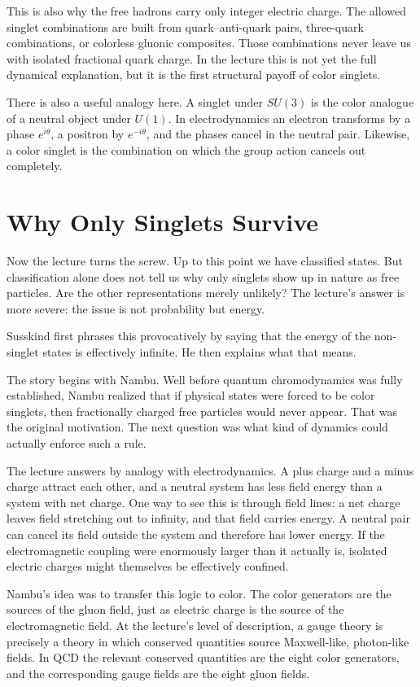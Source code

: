 This is also why the free hadrons carry only integer electric charge. The allowed singlet combinations are built from quark--anti-quark pairs, three-quark combinations, or colorless gluonic composites. Those combinations never leave us with isolated fractional quark charge. In the lecture this is not yet the full dynamical explanation, but it is the first structural payoff of color singlets.

There is also a useful analogy here. A singlet under \(SU(3)\) is the color analogue of a neutral object under \(U(1)\). In electrodynamics an electron transforms by a phase \(e^{i\theta}\), a positron by \(e^{-i\theta}\), and the phases cancel in the neutral pair. Likewise, a color singlet is the combination on which the group action cancels out completely.

\section{Why Only Singlets Survive}

Now the lecture turns the screw. Up to this point we have classified states. But classification alone does not tell us why only singlets show up in nature as free particles. Are the other representations merely unlikely? The lecture's answer is more severe: the issue is not probability but energy.

Susskind first phrases this provocatively by saying that the energy of the non-singlet states is effectively infinite. He then explains what that means.

The story begins with Nambu. Well before quantum chromodynamics was fully established, Nambu realized that if physical states were forced to be color singlets, then fractionally charged free particles would never appear. That was the original motivation. The next question was what kind of dynamics could actually enforce such a rule.

The lecture answers by analogy with electrodynamics. A plus charge and a minus charge attract each other, and a neutral system has less field energy than a system with net charge. One way to see this is through field lines: a net charge leaves field stretching out to infinity, and that field carries energy. A neutral pair can cancel its field outside the system and therefore has lower energy. If the electromagnetic coupling were enormously larger than it actually is, isolated electric charges might themselves be effectively confined.

Nambu's idea was to transfer this logic to color. The color generators are the sources of the gluon field, just as electric charge is the source of the electromagnetic field. At the lecture's level of description, a gauge theory is precisely a theory in which conserved quantities source Maxwell-like, photon-like fields. In QCD the relevant conserved quantities are the eight color generators, and the corresponding gauge fields are the eight gluon fields.

